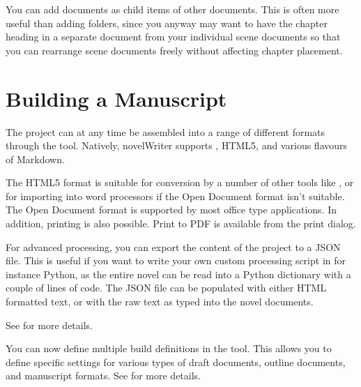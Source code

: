 \documentclass[a4paper,11pt,english]{sphinxmanual}
\begin{document}
\sphinxAtStartPar
{}You can add documents as child items of other documents. This is often more useful than adding
folders, since you anyway may want to have the chapter heading in a separate document from your
individual scene documents so that you can rearrange scene documents freely without affecting
chapter placement.


\section{Building a Manuscript}
\label{\detokenize{usage_breakdown:building-a-manuscript}}\label{\detokenize{usage_breakdown:a-breakdown-export}}
\sphinxAtStartPar
The project can at any time be assembled into a range of different formats through the
 tool. Natively, novelWriter supports , HTML5, and
various flavours of Markdown.

\sphinxAtStartPar
The HTML5 format is suitable for conversion by a number of other tools like , or for
importing into word processors if the Open Document format isn’t suitable. The Open Document format
is supported by most office type applications. In addition, printing is also possible. Print to PDF
is available from the print dialog.

\sphinxAtStartPar
For advanced processing, you can export the content of the project to a JSON file. This is useful
if you want to write your own custom processing script in for instance Python, as the entire novel
can be read into a Python dictionary with a couple of lines of code. The JSON file can be populated
with either HTML formatted text, or with the raw text as typed into the novel documents.

\sphinxAtStartPar
See {\hyperref[\detokenize{project_manuscript:a-manuscript}]{}} for more details.

\sphinxAtStartPar
{}You can now define multiple build definitions in the  tool. This allows you
to define specific settings for various types of draft documents, outline documents, and
manuscript formats. See {\hyperref[\detokenize{project_manuscript:a-manuscript}]{}} for more details.
\end{document}
